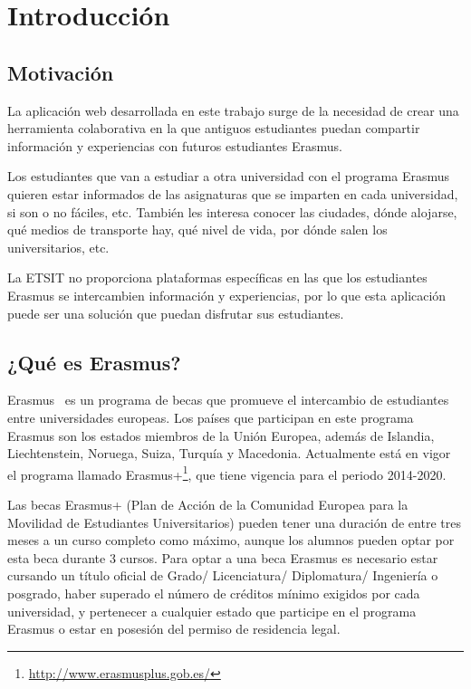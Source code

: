 \documentclass[a4paper, 12pt]{book}
\begin{document}
\cleardoublepage
\chapter{Introducción}
\label{sec:intro} %

\section{Motivación}
\label{sec:motivacion}

La aplicación web desarrollada en este trabajo surge de la necesidad de crear una herramienta colaborativa en la que antiguos estudiantes puedan compartir información y experiencias con futuros estudiantes Erasmus. 
\newline

Los estudiantes que van a estudiar a otra universidad con el programa Erasmus quieren estar informados de las asignaturas que se imparten en cada universidad, si son o no fáciles, etc. También les interesa conocer las ciudades, dónde alojarse, qué medios de transporte hay, qué nivel de vida, por dónde salen los universitarios, etc.
\newline

La ETSIT no proporciona plataformas específicas en las que los estudiantes Erasmus se intercambien información y experiencias, por lo que esta aplicación puede ser una solución que puedan disfrutar sus estudiantes.

\section{¿Qué es Erasmus?}
\label{sec:que-es-erasmus}

Erasmus~\cite{pagina-erasmus} es un programa de becas que promueve el intercambio de estudiantes entre universidades europeas. Los países que participan en este programa Erasmus son los estados miembros de la Unión Europea, además de Islandia, Liechtenstein, Noruega, Suiza, Turquía y Macedonia. Actualmente está en vigor el programa llamado Erasmus+\footnote{\url{http://www.erasmusplus.gob.es/}}, que tiene vigencia para el periodo 2014-2020.
\newline

Las becas Erasmus+ (Plan de Acción de la Comunidad Europea para la Movilidad de Estudiantes Universitarios) pueden tener una duración de entre tres meses a un curso completo como máximo, aunque los alumnos pueden optar por esta beca durante 3 cursos. Para optar a una beca Erasmus es necesario estar cursando un título oficial de Grado/ Licenciatura/ Diplomatura/ Ingeniería o posgrado, haber superado el número de créditos mínimo exigidos por cada universidad, y pertenecer a cualquier estado que participe en el programa Erasmus o estar en posesión del permiso de residencia legal.
\newline
\end{document}
